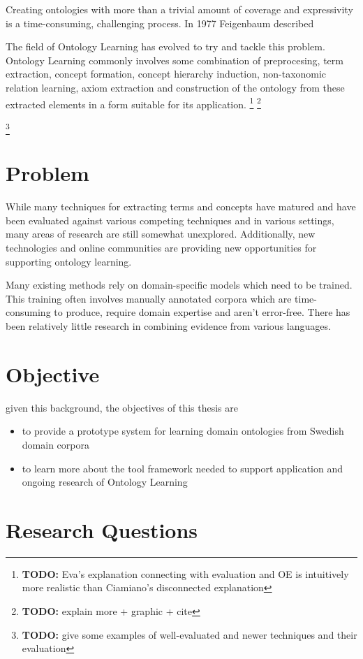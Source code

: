 \documentclass[a4paper]{report}
\newcommand{\todo}[1]{\footnote{{\color{red} {\bf TODO:} #1}}}
\begin{document}
Creating ontologies with more than a trivial amount of coverage and expressivity is a time-consuming, challenging process.
In 1977 Feigenbaum described 

The field of Ontology Learning has evolved to try and tackle this problem.
Ontology Learning commonly involves some combination of preprocesing, term extraction, concept formation, concept hierarchy induction, non-taxonomic relation learning, axiom extraction and construction of the ontology from these extracted elements in a form suitable for its application.
\todo{Eva's explanation connecting with evaluation and OE is intuitively more realistic than Ciamiano's disconnected explanation}
\todo{explain more + graphic + cite}

\todo{give some examples of well-evaluated and newer techniques and their evaluation}

\section{Problem}

While many techniques for extracting terms and concepts have matured and have been evaluated against various competing techniques and in various settings, many areas of research are still somewhat unexplored.
Additionally, new technologies and online communities are providing new opportunities for supporting ontology learning.

Many existing methods rely on domain-specific models which need to be trained.
This training often involves manually annotated corpora which are time-consuming to produce, require domain expertise and aren't error-free.
There has been relatively little research in combining evidence from various languages.

\section{Objective}

given this background, the objectives of this thesis are

\begin{itemize}
  \item to provide a prototype system for learning domain ontologies from Swedish domain corpora
  \item to learn more about the tool framework needed to support application and ongoing research of Ontology Learning
\end{itemize}

\section{Research Questions}
\end{document}

